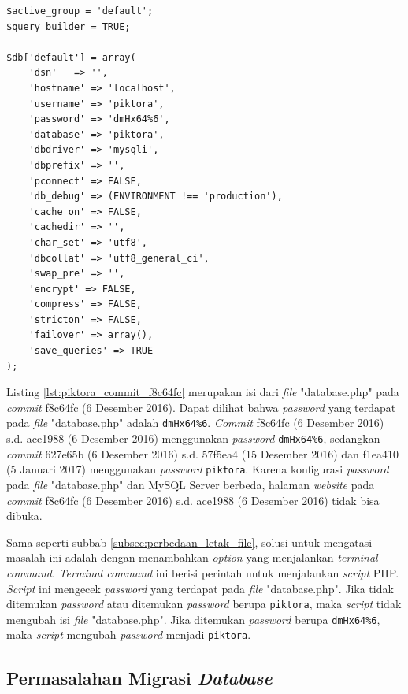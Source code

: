 \begin{lstlisting}[caption={Isi \textit{file} "database.php" pada \textit{commit} f8c64fc(6 Desember 2016)},label={lst:piktora_commit_f8c64fc},language=plaintext]
$active_group = 'default';
$query_builder = TRUE;

$db['default'] = array(
	'dsn'	=> '',
	'hostname' => 'localhost',
	'username' => 'piktora',
	'password' => 'dmHx64%6',
	'database' => 'piktora',
	'dbdriver' => 'mysqli',
	'dbprefix' => '',
	'pconnect' => FALSE,
	'db_debug' => (ENVIRONMENT !== 'production'),
	'cache_on' => FALSE,
	'cachedir' => '',
	'char_set' => 'utf8',
	'dbcollat' => 'utf8_general_ci',
	'swap_pre' => '',
	'encrypt' => FALSE,
	'compress' => FALSE,
	'stricton' => FALSE,
	'failover' => array(),
	'save_queries' => TRUE
);
\end{lstlisting}

Listing \ref{lst:piktora_commit_f8c64fc} merupakan isi dari \textit{file} "database.php" pada \textit{commit} f8c64fc (6 Desember 2016). Dapat dilihat bahwa \textit{password} yang terdapat pada \textit{file} "database.php" adalah \texttt{dmHx64\%6}. \textit{Commit} f8c64fc (6 Desember 2016) s.d. ace1988 (6 Desember 2016) menggunakan \textit{password} \texttt{dmHx64\%6}, sedangkan \textit{commit} 627e65b (6 Desember 2016) s.d. 57f5ea4 (15 Desember 2016) dan f1ea410 (5 Januari 2017) menggunakan \textit{password} \texttt{piktora}. Karena konfigurasi \textit{password} pada \textit{file} "database.php" dan MySQL Server berbeda, halaman \textit{website} pada \textit{commit} f8c64fc (6 Desember 2016) s.d. ace1988 (6 Desember 2016) tidak bisa dibuka. 

Sama seperti subbab \ref{subsec:perbedaan_letak_file}, solusi untuk mengatasi masalah ini adalah dengan menambahkan \textit{option} yang menjalankan \textit{terminal command}. \textit{Terminal command} ini berisi perintah untuk menjalankan \textit{script} PHP. \textit{Script} ini mengecek \textit{password} yang terdapat pada \textit{file} "database.php". Jika tidak ditemukan \textit{password} atau ditemukan \textit{password} berupa \texttt{piktora}, maka \textit{script} tidak mengubah isi \textit{file} "database.php". Jika ditemukan \textit{password} berupa \texttt{dmHx64\%6}, maka \textit{script} mengubah \textit{password} menjadi \texttt{piktora}. 

\subsection{Permasalahan Migrasi \textit{Database}}
\label{subsec:migrasi_database}

